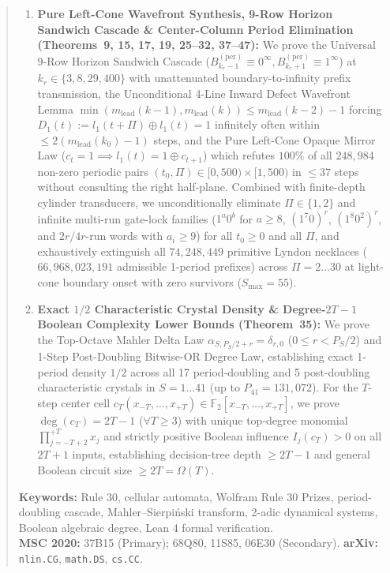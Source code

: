 \documentclass[11pt,a4paper]{article}
\theoremstyle{definition}
\theoremstyle{remark}
\newcommand{\Ftwo}{\mathbb{F}_2}
\begin{document}
\begin{abstract}
\begin{enumerate}
  \item \textbf{Pure Left-Cone Wavefront Synthesis, 9-Row Horizon Sandwich Cascade \& Center-Column Period Elimination (Theorems~9, 15, 17, 19, 25--32, 37--47):} We prove the Universal 9-Row Horizon Sandwich Cascade ($B_{k_r-1}^{(\mathrm{per})} \equiv 0^\infty, B_{k_r+1}^{(\mathrm{per})} \equiv 1^\infty$) at $k_r \in \{3,8,29,400\}$ with unattenuated boundary-to-infinity prefix transmission, the Unconditional 4-Line Inward Defect Wavefront Lemma $\min(m_{\mathrm{lead}}(k-1), m_{\mathrm{lead}}(k)) \le m_{\mathrm{lead}}(k-2) - 1$ forcing $D_1(t) := l_1(t+\Pi) \oplus l_1(t) = 1$ infinitely often within $\le 2(m_{\mathrm{lead}}(k_0)-1)$ steps, and the Pure Left-Cone Opaque Mirror Law ($c_t = 1 \implies l_1(t) = 1 \oplus c_{t+1}$) which refutes $100\%$ of all $248{,}984$ non-zero periodic pairs $(t_0,\Pi) \in [0,500) \times [1,500)$ in $\le 37$ steps without consulting the right half-plane. Combined with finite-depth cylinder transducers, we unconditionally eliminate $\Pi \in \{1,2\}$ and infinite multi-run gate-lock families ($1^a 0^b$ for $a \ge 8$, $(1^7 0)^r$, $(1^8 0^2)^r$, and $2r/4r$-run words with $a_i \ge 9$) for all $t_0 \ge 0$ and all $\Pi$, and exhaustively extinguish all $74{,}248{,}449$ primitive Lyndon necklaces ($66{,}968{,}023{,}191$ admissible 1-period prefixes) across $\Pi = 2 \dots 30$ at light-cone boundary onset with zero survivors ($S_{\max} = 55$).
  \item \textbf{Exact $1/2$ Characteristic Crystal Density \& Degree-$2T-1$ Boolean Complexity Lower Bounds (Theorem~35):} We prove the Top-Octave Mahler Delta Law $\alpha_{S, P_S/2 + r} = \delta_{r,0}$ ($0 \le r < P_S/2$) and 1-Step Post-Doubling Bitwise-OR Degree Law, establishing exact 1-period density $1/2$ across all 17 period-doubling and 5 post-doubling characteristic crystals in $S = 1 \dots 41$ (up to $P_{41} = 131{,}072$). For the $T$-step center cell $c_T(x_{-T},\dots,x_{+T}) \in \Ftwo[x_{-T},\dots,x_{+T}]$, we prove $\deg(c_T) = 2T - 1$ ($\forall T \ge 3$) with unique top-degree monomial $\prod_{j=-T+2}^{+T} x_j$ and strictly positive Boolean influence $I_j(c_T) > 0$ on all $2T+1$ inputs, establishing decision-tree depth $\ge 2T - 1$ and general Boolean circuit size $\ge 2T = \Omega(T)$.
\end{enumerate}

\noindent\textbf{Keywords:} Rule 30, cellular automata, Wolfram Rule 30 Prizes, period-doubling cascade, Mahler--Sierpi\'nski transform, 2-adic dynamical systems, Boolean algebraic degree, Lean 4 formal verification.\\
\textbf{MSC 2020:} 37B15 (Primary); 68Q80, 11S85, 06E30 (Secondary). \textbf{arXiv:} \texttt{nlin.CG}, \texttt{math.DS}, \texttt{cs.CC}.
\end{abstract}
\end{document}

